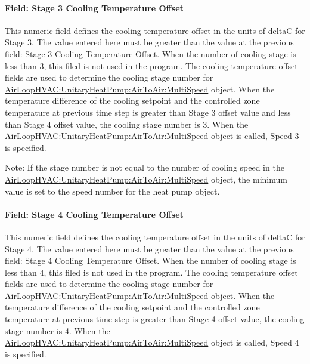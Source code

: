 \paragraph{Field: Stage 3 Cooling Temperature Offset}\label{field-stage-3-cooling-temperature-offset}

This numeric field defines the cooling temperature offset in the units of deltaC for Stage 3. The value entered here must be greater than the value at the previous field: Stage 3 Cooling Temperature Offset. When the number of cooling stage is less than 3, this filed is not used in the program. The cooling temperature offset fields are used to determine the cooling stage number for \hyperref[airloophvacunitaryheatpumpairtoairmultispeed]{AirLoopHVAC:UnitaryHeatPump:AirToAir:MultiSpeed} object. When the temperature difference of the cooling setpoint and the controlled zone temperature at previous time step is greater than Stage 3 offset value and less than Stage 4 offset value, the cooling stage number is 3. When the \hyperref[airloophvacunitaryheatpumpairtoairmultispeed]{AirLoopHVAC:UnitaryHeatPump:AirToAir:MultiSpeed} object is called, Speed 3 is specified.

Note: If the stage number is not equal to the number of cooling speed in the \hyperref[airloophvacunitaryheatpumpairtoairmultispeed]{AirLoopHVAC:UnitaryHeatPump:AirToAir:MultiSpeed} object, the minimum value is set to the speed number for the heat pump object.

\paragraph{Field: Stage 4 Cooling Temperature Offset}\label{field-stage-4-cooling-temperature-offset}

This numeric field defines the cooling temperature offset in the units of deltaC for Stage 4. The value entered here must be greater than the value at the previous field: Stage 4 Cooling Temperature Offset. When the number of cooling stage is less than 4, this filed is not used in the program. The cooling temperature offset fields are used to determine the cooling stage number for \hyperref[airloophvacunitaryheatpumpairtoairmultispeed]{AirLoopHVAC:UnitaryHeatPump:AirToAir:MultiSpeed} object. When the temperature difference of the cooling setpoint and the controlled zone temperature at previous time step is greater than Stage 4 offset value, the cooling stage number is 4. When the \hyperref[airloophvacunitaryheatpumpairtoairmultispeed]{AirLoopHVAC:UnitaryHeatPump:AirToAir:MultiSpeed} object is called, Speed 4 is specified.

